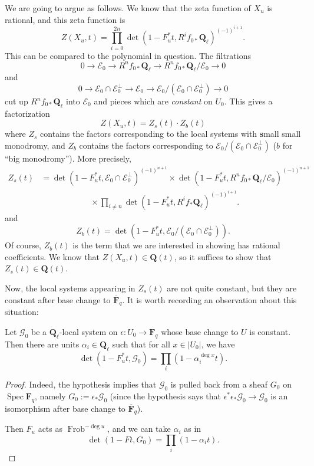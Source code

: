 \documentclass[letterpaper,11pt]{article}
\DeclareMathOperator{\Spec}{Spec}
\DeclareMathOperator{\Frob}{Frob}
\newcommand{\F}{\mathbf{F}}
\newcommand{\Q}{\mathbf{Q}}
\newcommand{\ol}[1]{\overline{#1}}
\newcommand{\Cal}[1]{\mathcal{#1}}
\begin{document}
We are going to argue as follows. We know that the zeta function of $X_u$ is rational, and this zeta function is 
\[
Z(X_u, t) =  \prod_{i=0}^{2n} \det(1-F_u^* t, R^i f_{0*}  \Q_{\ell})^{(-1)^{i+1}}.
\]
This can be compared to the polynomial in question. The filtrations
\[
0 \rightarrow \Cal{E}_0 \rightarrow R^n f_{0*}  \Q_{\ell} \rightarrow R^n f_{0*} \Q_{\ell} / \Cal{E}_0 \rightarrow 0
\]
and 
\[
0 \rightarrow \Cal{E}_0 \cap \Cal{E}_0^{\perp} \rightarrow  \Cal{E}_0 \rightarrow \Cal{E}_0/(\Cal{E}_0 \cap \Cal{E}_0^{\perp}) \rightarrow 0
\]
cut up $R^n f_{0*}  \Q_{\ell}$ into $\Cal{E}_0$ and pieces which are \emph{constant} on $U_0$. This gives a factorization 
\[
Z (X_u, t) = Z_s(t) \cdot Z_b(t)
\]
where $Z_s$ contains the factors corresponding to the local systems with \textbf{s}mall small monodromy, and $Z_b$ contains the factors corresponding to $\Cal{E}_0/(\Cal{E}_0 \cap \Cal{E}_0^{\perp})$ ($b$ for ``big monodromy''). More precisely, 
\begin{align*}
Z_s(t) &= \det (1- F_u^* t,   \Cal{E}_0 \cap \Cal{E}_0^{\perp} )^{(-1)^{n+1}}  \times \det (1- F_u^* t, R^n f_{0*} \Q_{\ell} / \Cal{E}_0 )^{(-1)^{n+1}}  \\
& \hspace{1in} \times \prod_{i\neq n} \det(1-F_u^* t, R^i f_* \Q_{\ell})^{(-1)^{i+1}}.
\end{align*}
and 
\[
Z_b(t) =  \det (1- F_u^* t, \Cal{E}_0/(\Cal{E}_0 \cap \Cal{E}_0^{\perp})).
\]
Of course, $Z_b(t)$ is the term that we are interested in showing has rational coefficients. We know that $Z(X_u, t) \in \Q(t)$, so it suffices to show that $Z_s(t) \in \Q(t)$. 

Now, the local systems appearing in $Z_s(t)$ are not quite constant, but they are constant after base change to $\ol{\F}_q$. It is worth recording an observation about this situation:


\begin{lemma}
Let $\Cal{G}_0$ be a $\Q_{\ell}$-local system on $\epsilon \colon U_0 \rightarrow \F_q$ whose base change to $U$ is constant. Then there are units $\alpha_i \in \Q_{\ell}$ such that for all $x \in |U_0|$, we have 
\[
\det (1-F_u^*t, \Cal{G}_0) = \prod_i (1-\alpha_i^{\deg x} t).
\]
\end{lemma}

\begin{proof}
Indeed, the hypothesis implies that $\Cal{G}_0$ is pulled back from a sheaf $G_0$ on $\Spec \F_q$, namely $G_0 := \epsilon_* \Cal{G}_0$ (since the hypothesis says that $\epsilon^* \epsilon_* \Cal{G}_0 \rightarrow \Cal{G}_0$ is an isomorphism after base change to $\ol{\F}_q$). 

Then $F_u$ acts as $\Frob^{-\deg u}$, and we can take $\alpha_i$ as in 
\[
\det (1- F t, G_0) = \prod_i (1-\alpha_i t).
\]
\end{proof}
\end{document}
